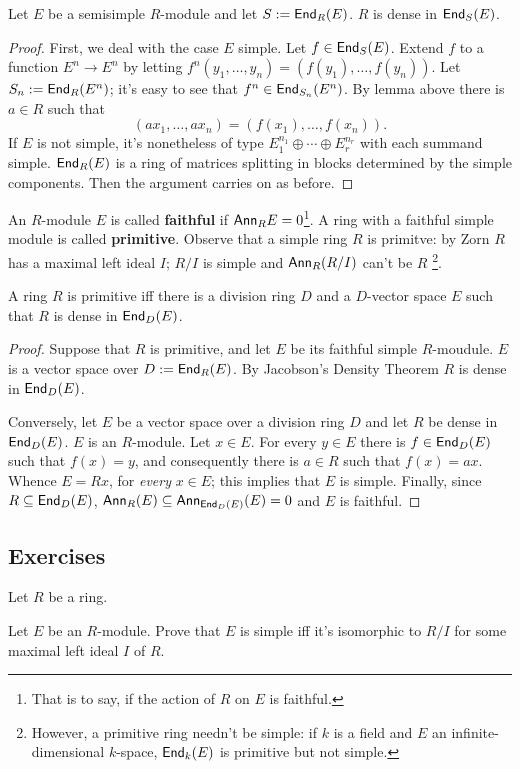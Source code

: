 \begin{thm}  Let $E$ be a semisimple $R$-module and let $S:=\operatorname{\sf{End}}_R(E)$. 
$R$ is dense in $\operatorname{\sf{End}}_S(E)$.
\begin{proof}
First, we deal with the case $E$ simple. 
Let $f \in \operatorname{\sf{End}}_S(E)$. 
Extend $f$ to a function $E^n \to E^n$ by letting $f^n(y_1, \ldots, y_n)=(f(y_1), \ldots, f(y_n))$.
Let $S_n:=\operatorname{\sf{End}}_R(E^n)$; it's easy to see that $f^n \in \operatorname{\sf{End}}_{S_n}(E^n)$. 
By lemma above there is $a \in R$ such that 
$$(ax_1, \ldots, ax_n)=(f(x_1), \ldots, f(x_n))\text{.}$$
If $E$ is not simple, it's nonetheless of type $E_1^{n_1} \oplus \cdots \oplus E_r^{n_r}$ with each summand simple. 
$\operatorname{\sf{End}}_R(E)$ is a ring of matrices splitting in blocks determined by the simple components. 
Then the argument carries on as before.  
\end{proof}
\end{thm}

An $R$-module $E$ is called \textbf{faithful} if $\textsf{Ann}_R E=0$\footnote{That is to say, if the action of $R$ on $E$ is faithful.}. 
A ring with a faithful simple module is called \textbf{primitive}. 
Observe that a simple ring $R$ is primitve: by Zorn $R$ has a maximal left ideal $I$; $R/I$ is simple and $\textsf{Ann}_R(R/I)$ can't be $R$ \footnote{However, a primitive ring needn't be simple: if $k$ is a field and $E$ an infinite-dimensional $k$-space, $\operatorname{\sf{End}}_k(E)$ is primitive but not simple.}. 

\begin{cor}
A ring $R$ is primitive iff there is a division ring $D$ and a $D$-vector space $E$ such that $R$ is dense in $\operatorname{\sf{End}}_D(E)$. 
\begin{proof}
Suppose that $R$ is primitive, and let $E$ be its faithful simple $R$-moudule. $E$ is a vector space over $D:=\operatorname{\sf{End}}_R(E)$. 
By Jacobson's Density Theorem $R$ is dense in $\operatorname{\sf{End}}_D(E)$.  

Conversely, let $E$ be a vector space over a division ring $D$ and let $R$ be dense in $\operatorname{\sf{End}}_D(E)$. 
$E$ is an $R$-module. 
Let $x \in E$. For every $y \in E$ there is $f \in \operatorname{\sf{End}}_D(E)$ such that $f(x)=y$, and consequently there is $a \in R$ such that $f(x)=ax$. Whence $E=Rx$, for \emph{every} $x \in E$; this implies that $E$ is simple. 
Finally, since $R \subseteq \operatorname{\sf{End}}_D(E)$, $\textsf{Ann}_R(E) \subseteq \textsf{Ann}_{\operatorname{\sf{End}}_D(E)}(E)=0$ and $E$ is faithful. 
\end{proof}
\end{cor}

\subsection*{Exercises}
Let $R$ be a ring. 
\begin{ex} Let $E$ be an $R$-module. Prove that $E$ is simple iff it's isomorphic to $R/I$ for some maximal left ideal $I$ of $R$.
\end{ex}

